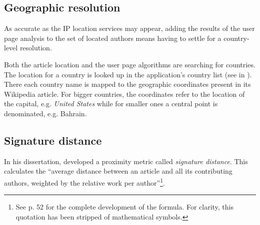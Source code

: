
\subsection{Geographic resolution}\label{sub:resolution}

As accurate as the IP location services may appear, adding the results of the user page analysis to the set of located authors means having to settle for a country-level resolution.

Both the article location and the user page algorithms are searching for countries.
The location for a country is looked up in the application's country list (see  in ).
There each country name is mapped to the geographic coordinates present in its Wikipedia article.
For bigger countries, the coordinates refer to the location of the capital, e.g. \emph{United States} while for smaller ones a central point is denominated, e.g. Bahrain.



\subsection{Signature distance}

In his dissertation, \textcite{hardy2011volunteered} developed a proximity metric called \emph{signature distance}.
This calculates the ``average distance between an article and all its contributing authors, weighted by the relative work
per author''\footnote{See p. 52 for the complete development of the formula. For clarity, this quotation has been stripped of mathematical symbols.}.

